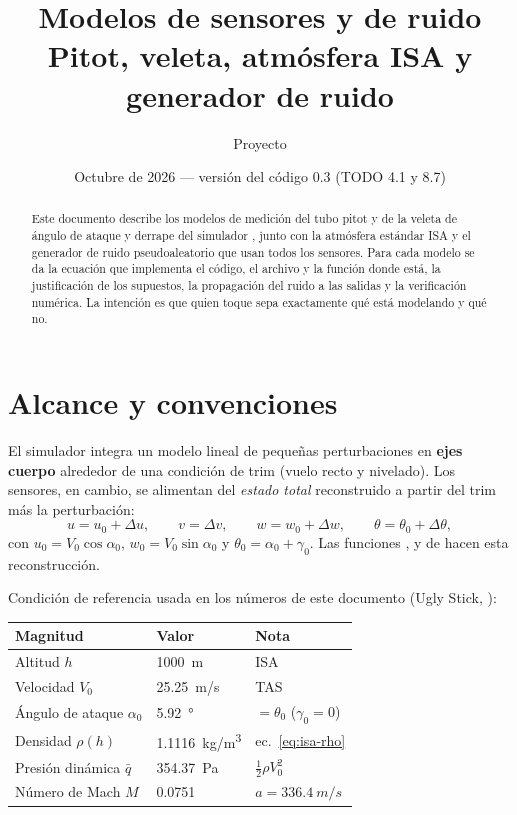 \documentclass[11pt,a4paper]{article}
\title{Modelos de sensores y de ruido\\[0.3em]
       \large Pitot, veleta, atmósfera ISA y generador de ruido}
\author{Proyecto \proyecto}
\date{Octubre de 2026 --- versión del código 0.3 (TODO 4.1 y 8.7)}
\begin{document}
\maketitle

\begin{abstract}
Este documento describe los modelos de medición del tubo pitot y de la veleta
de ángulo de ataque y derrape del simulador \proyecto, junto con la atmósfera
estándar ISA y el generador de ruido pseudoaleatorio que usan todos los
sensores. Para cada modelo se da la ecuación que implementa el código, el
archivo y la función donde está, la justificación de los supuestos, la
propagación del ruido a las salidas y la verificación numérica. La intención
es que quien toque  sepa exactamente qué está
modelando y qué no.
\end{abstract}

\tableofcontents

\section{Alcance y convenciones}

El simulador integra un modelo lineal de pequeñas perturbaciones en
\textbf{ejes cuerpo} alrededor de una condición de trim (vuelo recto y
nivelado). Los sensores, en cambio, se alimentan del \emph{estado total}
reconstruido a partir del trim más la perturbación:
\begin{equation}
  u = u_0 + \Delta u, \qquad v = \Delta v, \qquad w = w_0 + \Delta w,
  \qquad \theta = \theta_0 + \Delta\theta,
  \label{eq:estado-total}
\end{equation}
con $u_0 = V_0\cos\alpha_0$, $w_0 = V_0\sin\alpha_0$ y $\theta_0 = \alpha_0 + \gamma_0$.
Las funciones ,  y
 de  hacen esta
reconstrucción.

Condición de referencia usada en los números de este documento (Ugly Stick,
):

\begin{center}
\begin{tabular}{lll}
\toprule
Magnitud & Valor & Nota \\
\midrule
Altitud $h$            & \SI{1000}{m}            & ISA \\
Velocidad $V_0$        & \SI{25.25}{m/s}         & TAS \\
Ángulo de ataque $\alpha_0$ & \SI{5.92}{\degree} & $=\theta_0$ ($\gamma_0 = 0$) \\
Densidad $\rho(h)$     & \SI{1.1116}{kg/m^3}     & ec.~\eqref{eq:isa-rho} \\
Presión dinámica $\bar q$ & \SI{354.37}{Pa}      & $\tfrac12\rho V_0^2$ \\
Número de Mach $M$     & 0.0751                  & $a = \SI{336.4}{m/s}$ \\
\bottomrule
\end{tabular}
\end{center}
\end{document}
